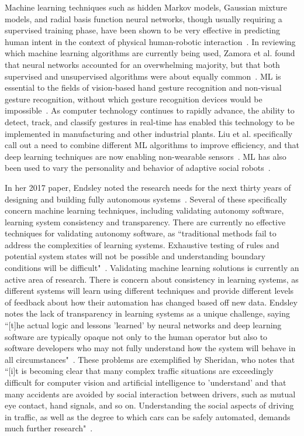 Machine learning techniques such as hidden Markov models, Gaussian mixture models, and radial basis function neural networks, though usually requiring a supervised training phase, have been shown to be very effective in predicting human intent in the context of physical human-robotic interaction~\citep{losey_review_2018}.
In reviewing which machine learning algorithms are currently being used, Zamora et al. found that neural networks accounted for an overwhelming majority, but that both supervised and unsupervised algorithms were about equally common~\citep{zamora_machine_2017}.
ML is essential to the fields of vision-based hand gesture recognition and non-visual gesture recognition, without which gesture recognition devices would be impossible~\citep{liu_gesture_2018, rautaray_vision_2015, 8701742}.
As computer technology continues to rapidly advance, the ability to detect, track, and classify gestures in real-time has enabled this technology to be implemented in manufacturing and other industrial plants.
Liu et al. specifically call out a need to combine different ML algorithms to improve efficiency, and that deep learning techniques are now enabling non-wearable sensors~\citep{liu_gesture_2018}.
ML has also been used to vary the personality and behavior of adaptive social robots~\citep{ahmad_systematic_2017}.

In her 2017 paper, Endsley noted the research needs for the next thirty years of designing and building fully autonomous systems~\citep{endsley_here_2017}.
Several of these specifically concern machine learning techniques, including validating autonomy software, learning system consistency and transparency.
There are currently no effective techniques for validating autonomy software, as ``traditional methods fail to address the complexities of learning systems.
Exhaustive testing of rules and potential system states will not be possible and understanding boundary conditions will be difficult"~\citep{endsley_here_2017}.
Validating machine learning solutions is currently an active area of research.
There is concern about consistency in learning systems, as different systems will learn using different techniques and provide different levels of feedback about how their automation has changed based off new data.
Endsley notes the lack of transparency in learning systems as a unique challenge, saying ``[t]he actual logic and lessons 'learned' by neural networks and deep learning software are typically opaque not only to the human operator but also to software developers who may not fully understand how the system will behave in all circumstances"~\citep{endsley_here_2017}.
These problems are exemplified by Sheridan, who notes that ``[i]t is becoming clear that many complex traffic situations are exceedingly difficult for computer vision and artificial intelligence to 'understand' and that many accidents are avoided by social interaction between drivers, such as mutual eye contact, hand signals, and so on.
Understanding the social aspects of driving in traffic, as well as the degree to which cars can be safely automated, demands much further research"~\citep{sheridan_humanrobot_2016}.

